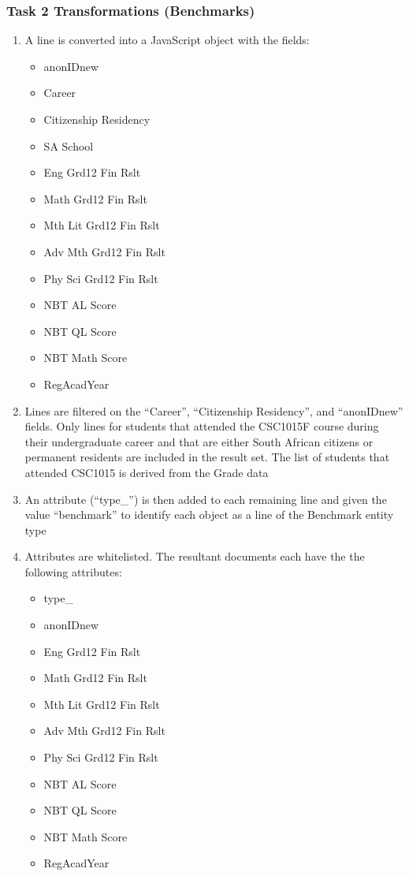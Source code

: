 \subsubsection{Task 2 Transformations (Benchmarks)}
\begin{enumerate}
  \item A line is converted into a JavaScript object with the fields:
        \begin{itemize}
          \item anonIDnew
          \item Career
          \item Citizenship Residency
          \item SA School
          \item Eng Grd12 Fin Rslt
          \item Math Grd12 Fin Rslt
          \item Mth Lit Grd12 Fin Rslt
          \item Adv Mth Grd12 Fin Rslt
          \item Phy Sci Grd12 Fin Rslt
          \item NBT AL Score
          \item NBT QL Score
          \item NBT Math Score
          \item RegAcadYear
        \end{itemize}
  \item Lines are filtered on the ``Career'', ``Citizenship Residency'', and ``anonIDnew'' fields. Only lines for students that attended the CSC1015F course during their undergraduate career and that are either South African citizens or permanent residents are included in the result set. The list of students that attended CSC1015 is derived from the Grade data
  \item An attribute (``type\_'') is then added to each remaining line and given the value ``benchmark'' to identify each object as a line of the Benchmark entity type
  \item Attributes are whitelisted. The resultant documents each have the the following attributes:
        \begin{itemize}
          \item type\_
          \item anonIDnew
          \item Eng Grd12 Fin Rslt
          \item Math Grd12 Fin Rslt
          \item Mth Lit Grd12 Fin Rslt
          \item Adv Mth Grd12 Fin Rslt
          \item Phy Sci Grd12 Fin Rslt
          \item NBT AL Score
          \item NBT QL Score
          \item NBT Math Score
          \item RegAcadYear
        \end{itemize}
\end{enumerate}

